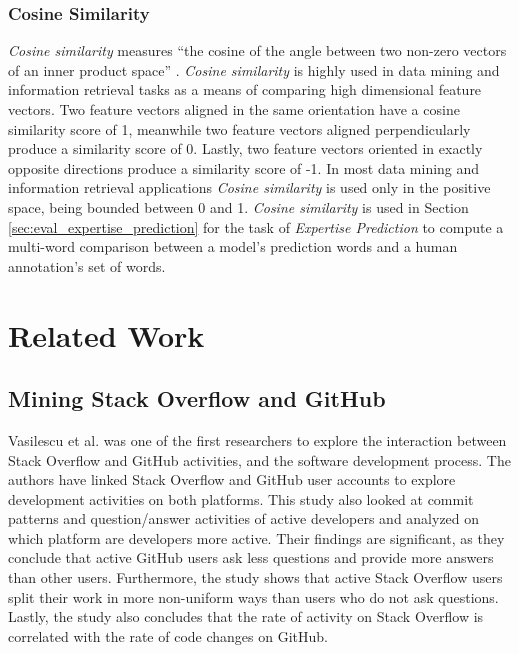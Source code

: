         \subsubsection{Cosine Similarity}
            \emph{Cosine similarity} measures ``the cosine of the angle between two non-zero vectors of an inner product space'' \cite{cosSim_def}. \emph{Cosine similarity} is highly used in data mining and information retrieval tasks as a means of comparing high dimensional feature vectors. Two feature vectors aligned in the same orientation have a cosine similarity score of 1, meanwhile two feature vectors aligned perpendicularly produce a similarity score of 0. Lastly, two feature vectors oriented in exactly opposite directions produce a similarity score of -1. In most data mining and information retrieval applications \emph{Cosine similarity} is used only in the positive space, being bounded between 0 and 1. \emph{Cosine similarity} is used in Section \ref{sec:eval_expertise_prediction} for the task of \emph{Expertise Prediction} to compute a multi-word comparison between a model's prediction words and a human annotation's set of words.
            

\section{Related Work}\label{sec:relatedWork}

    \subsection{Mining Stack Overflow and GitHub}
        Vasilescu et al. \cite{vasilescu2013stackoverflow} was one of the first researchers to explore the interaction between Stack Overflow and GitHub activities, and the software development process. The authors have linked Stack Overflow and GitHub user accounts to explore development activities on both platforms. This study also looked at commit patterns and question/answer activities of active developers and analyzed on which platform are developers more active. Their findings are significant, as they conclude that active GitHub users ask less questions and provide more answers than other users. Furthermore, the study shows that active Stack Overflow users split their work in more non-uniform ways than users who do not ask questions. Lastly, the study also concludes that the rate of activity on Stack Overflow is correlated with the rate of code changes on GitHub.
        
